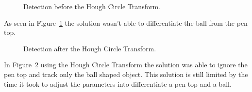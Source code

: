 \documentclass[10pt,twocolumn,letterpaper]{article}
\begin{document}
  \begin{figure}[!h]
    \centering
    \setlength{\fboxsep}{1pt}
    \setlength{\fboxrule}{1pt}
    \caption{Detection before the Hough Circle Transform.}\label{fig:not_hough}
  \end{figure}

  As seen in Figure~\ref{fig:not_hough} the solution wasn't able to
  differentiate the ball from the pen top.

  \begin{figure}[!h]
    \centering
    \setlength{\fboxsep}{1pt}
    \setlength{\fboxrule}{1pt}
    \caption{Detection after the Hough Circle Transform.}\label{fig:yes_hough}
  \end{figure}

  In Figure~\ref{fig:yes_hough} using the Hough Circle Transform the solution
  was able to ignore the pen top and track only the ball shaped object. This
  solution is still limited by the time it took to adjust the parameters into
  differentiate a pen top and a ball.
\end{document}
